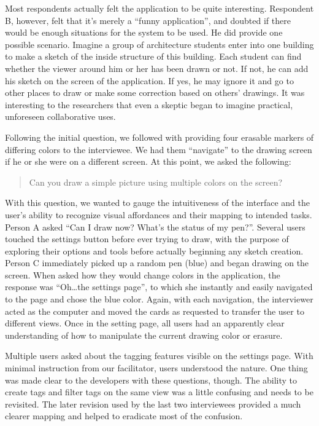 \documentclass{www2010-submission}
\begin{document}
Most respondents actually felt the application to be quite interesting.
Respondent B, however, felt that it's merely a ``funny application'', and doubted if 
there would be enough situations for the system to be used.   He did provide
one possible  scenario. Imagine a group of architecture students
enter into one building to make a sketch of the inside structure of this
building. Each student can find whether the viewer around him or her has been
drawn or not. If not, he can add his sketch on the screen of the application.
If yes, he may ignore it and go to other places to draw or make some correction
based on others' drawings.  It was interesting to the researchers that even a
skeptic began to imagine practical, unforeseen collaborative uses.

Following the initial question, we followed with providing four erasable
markers of differing colors to the interviewee.  We had them ``navigate'' to
the drawing screen if he or she were on a different screen.  At this point, we
asked the following:

\begin{quote}
Can you draw a simple picture using multiple colors on the screen?
\end{quote}

With this question, we wanted to gauge the intuitiveness of the interface and
the user's ability to recognize visual affordances and their mapping to
intended tasks.  Person A asked ``Can I draw now?  What's the status of my
pen?''.  Several users touched the settings button before ever trying to draw,
with the purpose of exploring their options and tools before actually beginning
any sketch creation.  Person C immediately picked up a random pen (blue) and
began drawing on the screen.  When asked how they would change colors in the
application, the response was ``Oh\ldots  the settings page'', to which she
instantly and easily navigated to the page and chose the blue color.  Again,
with each navigation, the interviewer acted as the computer and moved the cards
as requested to transfer the user to different views.  Once in the setting
page, all users had an apparently clear understanding of how to manipulate the
current drawing color or erasure.

Multiple users asked about the tagging features visible on the settings page.
With minimal instruction from our facilitator, users understood the nature.
One thing was made clear to the developers with these questions, though.  The
ability to create tags and filter tags on the same view was a little confusing
and needs to be revisited.  The later revision used by the last two
interviewees provided a much clearer mapping and helped to eradicate most of
the confusion.
\end{document}
